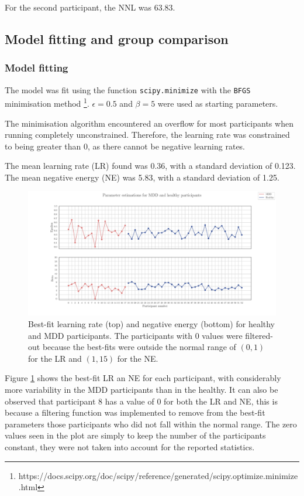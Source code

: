 \documentclass[12pt]{article}
\begin{document}
For the second participant, the NNL was 63.83.

\subsection{Model fitting and group comparison}

\subsubsection{Model fitting}

The model was fit using the function \texttt{scipy.minimize} with the \texttt{BFGS} minimisation method \footnote{https://docs.scipy.org/doc/scipy/reference/generated/scipy.optimize.minimize.html}. $\epsilon = 0.5$ and $\beta = 5$ were used as starting parameters.

The minimisation algorithm encountered an overflow for most participants when running completely unconstrained. Therefore, the learning rate was constrained to being greater than 0, as there cannot be negative learning rates.

The mean learning rate (LR) found was 0.36, with a standard deviation of 0.123. The mean negative energy (NE) was 5.83, with a standard deviation of 1.25. 

\begin{figure}[h!]
	\centering
	\hspace*{-0.6in}
	\includegraphics[width=1.1\linewidth]{figures/2.4.pdf}
	\caption{Best-fit learning rate (top) and negative energy (bottom) for healthy and MDD participants. The participants with 0 values were filtered-out because the best-fits were outside the normal range of $(0,1)$ for the LR and $(1, 15)$ for the NE.}
	\label{fig:2.4}
\end{figure}

Figure \ref{fig:2.4} shows the best-fit LR an NE for each participant, with considerably more variability in the MDD participants than in the healthy. It can also be observed that participant 8 has a value of 0 for both the LR and NE, this is because a filtering function was implemented to remove from the best-fit parameters those participants who did not fall within the normal range. The zero values seen in the plot are simply to keep the number of the participants constant, they were not taken into account for the reported statistics. 
\end{document}
